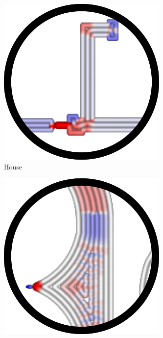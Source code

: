 \begin{figure}
\centering
\setlength{\figwidth}{0.099\textwidth}
\setlength{\figheight}{0.099\textwidth}
\begin{subfigure}{\textwidth}\centering
{}
\end{subfigure}
\begin{subfigure}[t]{\figwidth}\centering
\includegraphics[height=\figheight]{sources-applications-house.png}
\caption{House}\label{applications_house}
\end{subfigure}
\begin{subfigure}[t]{\figwidth}\centering
\includegraphics[height=\figheight]{sources-applications-pocket-operator-case.png}

\end{subfigure}
\end{figure}
